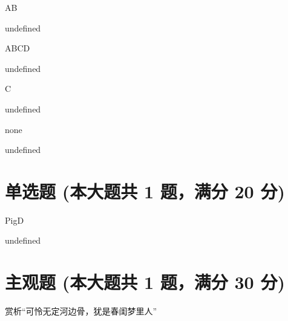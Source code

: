 \documentclass[12pt, a4paper, addpoints]{exam}
\begin{document}
\begin{questions}
\question[5] AB

\begin{oneparcheckboxes}
\end{oneparcheckboxes}

undefined

\question[5] ABCD

\begin{oneparcheckboxes}
\end{oneparcheckboxes}

undefined

\question[5] C

\begin{oneparcheckboxes}
\end{oneparcheckboxes}

undefined

\question[5] none

\begin{oneparcheckboxes}
\end{oneparcheckboxes}

undefined

\end{questions}

\hspace{5cm}

\section{\normalsize{单选题 (本大题共 1 题，满分 20 分)}}
\hspace{1.5cm}

\begin{questions}
\question[20] PigD

\begin{oneparchoices}
\end{oneparchoices}

undefined

\end{questions}

\hspace{5cm}

\section{\normalsize{主观题 (本大题共 1 题，满分 30 分)}}
\hspace{1.5cm}

\begin{questions}
\question[30] 赏析“可怜无定河边骨，犹是春闺梦里人”

\end{questions}
\end{document}

